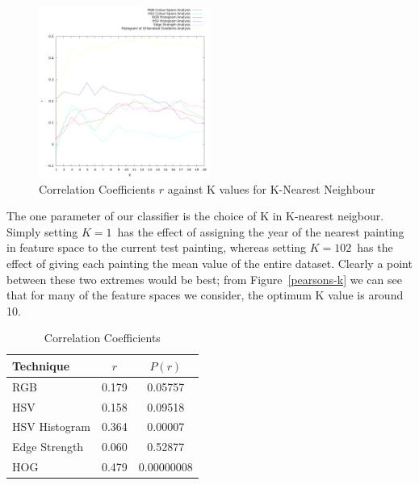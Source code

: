 \documentclass[conference,a4paper]{IEEEtran}
\begin{document}


\begin{figure}[h]
\centering
\includegraphics[width=0.5\textwidth]{results/test.pdf}
%
\caption{Correlation Coefficients $r$ against K values for K-Nearest Neighbour}
\end{figure}


The one parameter of our classifier is the choice of K in K-nearest neigbour.
Simply setting $K=1$\ has the effect of assigning the year of the nearest
painting in feature space to the current test painting, whereas setting
$K=102$\ has the effect of giving each painting the mean value of the entire
dataset. Clearly a point between these two extremes would be best; from
Figure~\ref{pearsons-k} we can see that for many of the feature spaces we
consider, the optimum K value is around 10.


\begin{table}[h]
\centering
\begin{tabular}{|p{3.5cm}|c|c|}
\hline
Technique     & $r$ & $P(r)$ \\ \hline
RGB           & 0.179 & 0.05757 \\
HSV           & 0.158 & 0.09518 \\
HSV Histogram & 0.364 & 0.00007 \\
Edge Strength & 0.060 & 0.52877 \\
HOG           & 0.479 & 0.00000008 \\
\hline

\end{tabular}
\caption{Correlation Coefficients}\label{tab:results}
\end{table}
\end{document}
